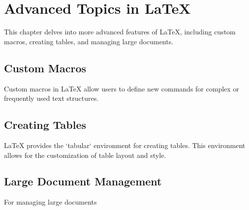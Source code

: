 \chapter{Advanced Topics in LaTeX}
\label{chap:advanced-topics}

This chapter delves into more advanced features of LaTeX, including custom macros, creating tables, and managing large documents.

\section{Custom Macros}
Custom macros in LaTeX allow users to define new commands for complex or frequently used text structures.

\section{Creating Tables}
LaTeX provides the `tabular` environment for creating tables. This environment allows for the customization of table layout and style.

\section{Large Document Management}
For managing large documents

